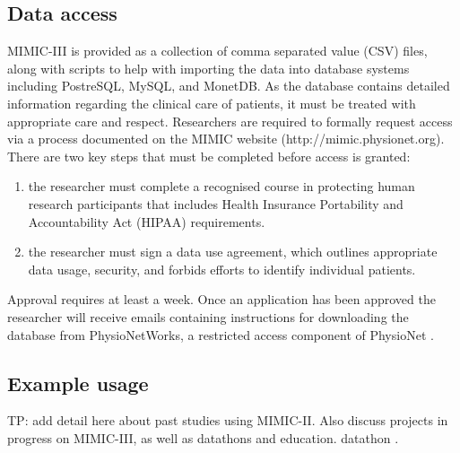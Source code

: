 \documentclass[english]{article}
\begin{document}

\subsection*{Data access}

MIMIC-III is provided as a collection of comma separated value (CSV) files, along with scripts to help with importing the data into database systems including PostreSQL, MySQL, and MonetDB. As the database contains detailed information regarding the clinical care of patients, it must be treated with appropriate care and respect. Researchers are required to formally request access via a process documented on the MIMIC website (http://mimic.physionet.org). There are two key steps that must be completed before access is granted:

\begin{enumerate}
  \item the researcher must complete a recognised course in protecting human research participants that includes Health Insurance Portability and Accountability Act (HIPAA) requirements.
  \item the researcher must sign a data use agreement, which outlines appropriate data usage, security, and forbids efforts to identify individual patients.
\end{enumerate}

Approval requires at least a week. Once an application has been approved the researcher will receive emails containing instructions for downloading the database from PhysioNetWorks, a restricted access component of PhysioNet \cite{cite6}.

\subsection*{Example usage}

TP: add detail here about past studies using MIMIC-II. Also discuss projects in progress on MIMIC-III, as well as datathons and education. datathon \cite{cite7}.

\end{document}
